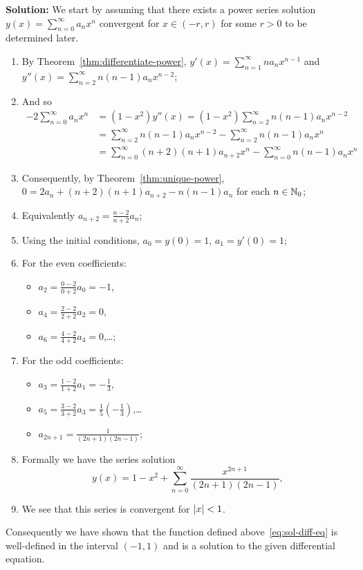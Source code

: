 \noindent
\textbf{Solution:}
We start by assuming that there exists a power series solution \(y(x) = \sum_{n=0}^{\infty}a_n x^n\) convergent for \(x \in (-r,r)\) for some \(r>0\) to be determined later.
\begin{enumerate}
  \item
        By Theorem~\ref{thm:differentiate-power}, \(y'(x) = \sum_{n=1}^{\infty}n a_n x^{n-1}\) and \(y''(x) = \sum_{n=2}^{\infty}n(n-1) a_n x^{n-2}\);
  \item And so
        \[
          \begin{aligned}
            -2 \sum_{n=0}^{\infty}a_n x^n
             & = (1-x^2)y''(x)
            = (1-x^2) \sum_{n=2}^{\infty}n(n-1) a_n x^{n-2}                                        \\
             & = \sum_{n=2}^{\infty}n(n-1) a_n x^{n-2} - \sum_{n=2}^{\infty}n(n-1) a_n x^{n}       \\
             & = \sum_{n=0}^{\infty}(n+2)(n+1) a_{n+2} x^{n} - \sum_{n=0}^{\infty}n(n-1) a_n x^{n}
          \end{aligned}
        \]
  \item Consequently, by Theorem~\ref{thm:unique-power}, \(0 = 2a_n +  (n+2)(n+1) a_{n+2} -  n(n-1) a_n \) for each \(n \in \mathbb{N}_0\);
  \item Equivalently \(a_{n+2} = \frac{n-2}{n+2}a_n\);
  \item Using the initial conditions,  \(a_0 = y(0) = 1\), \(a_1 = y'(0) = 1\);
  \item For the even coefficients:
        \begin{itemize}
          \item \(a_2 =  \frac{0-2}{0+2}a_0 = -1\),
          \item \(a_4 =  \frac{2-2}{2+2}a_2 = 0\),
          \item  \(a_6 =  \frac{4-2}{4+2}a_4 = 0\),\ldots;
        \end{itemize}
  \item For the odd coefficients:
        \begin{itemize}
          \item \(a_3 =  \frac{1-2}{1+2}a_1 = -\frac{1}{3}\),
          \item \(a_5= \frac{3-2}{3+2}a_3 = \frac{1}{5}(-\frac{1}{3})\),\ldots
          \item \(a_{2n+1} = \frac{1}{(2n+1)(2n-1)}\);
        \end{itemize}
  \item Formally we have the series solution
        \begin{equation}
          \label{eq:sol-diff-eq}
          y(x) = 1 - x^2 + \sum_{n=0}^{\infty} \frac{x^{2n+1}}{(2n+1)(2n-1)},
        \end{equation}
  \item We see that this series is convergent for \(\left|x\right|<1\).
\end{enumerate}
%
Consequently we have shown that the function defined above~\eqref{eq:sol-diff-eq} is well-defined in the interval \((-1,1)\) and is a solution to the given differential equation.



